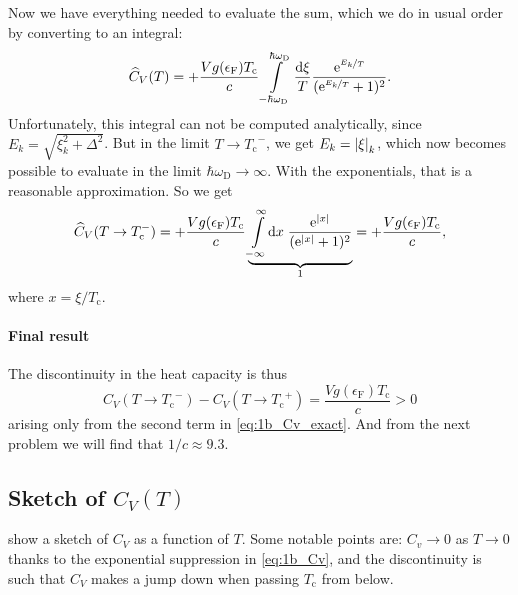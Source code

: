 \documentclass[11pt,letter, swedish, english
]{article}
\newcommand{\Tc}{\ensuremath{T_{\text{c}}}}
\newcommand{\eF}{\ensuremath{\epsilon_{\text{F}}}}
\newcommand{\wD}{\ensuremath{\omega_{\text{D}}}}
\begin{document}
Now we have everything needed to evaluate the sum, which we do in
usual order by converting to an integral:
\begin{equation}
\widehat{C}_V(T) = +\frac{Vg(\eF)\Tc}{c}
\int_{-\hbar\wD}^{\hbar\wD}\frac{\rd\xi}{T}
\frac{\ee^{\nicefrac{E_k}{T}}}{(\ee^{\nicefrac{E_k}{T}}+1)^2}.
\end{equation}
Unfortunately, this integral can not be computed analytically, since
$E_k=\sqrt{\xi_k^2+\Delta^2}$. But in the limit $T\to\Tc^-$, we get
$E_k=\abs{\xi}_k$, which now becomes possible to evaluate in the limit
$\hbar\wD\to\infty$. With the exponentials, that is a reasonable
approximation. So we get
\begin{equation}
\widehat{C}_V(T\to\Tc^-) = +\frac{Vg(\eF)\Tc}{c}
\underbrace{\int_{-\infty}^{\infty}\!\rd{x}\;
\frac{\ee^{|x|}}{(\ee^{|x|}+1)^2}}_{1}
= +\frac{Vg(\eF)\Tc}{c},
\end{equation}
where $x=\xi/\Tc$.

\paragraph{Final result}
The discontinuity in the heat capacity is thus
\begin{equation}
C_V(T\to\Tc^-)-C_V(T\to\Tc^+)=\frac{Vg(\eF)\Tc}{c}>0
\end{equation}
arising only from the second term in \eqref{eq:1b_Cv_exact}. And from
the next problem we will find that $1/c\approx9.3$.

\subsection{Sketch of $C_V(T)$}
 show a sketch of $C_V$ as a function of $T$. Some
notable points are: $C_v\to0$ as $T\to0$ thanks to the exponential
suppression in \eqref{eq:1b_Cv}, and the discontinuity is such that
$C_V$ makes a jump down when passing $\Tc$ from below.


\begin{figure}
\centering
\resizebox{.8\textwidth}{!}{}
\caption{}
\label{fig:1_Cv}
\end{figure}
\end{document}
